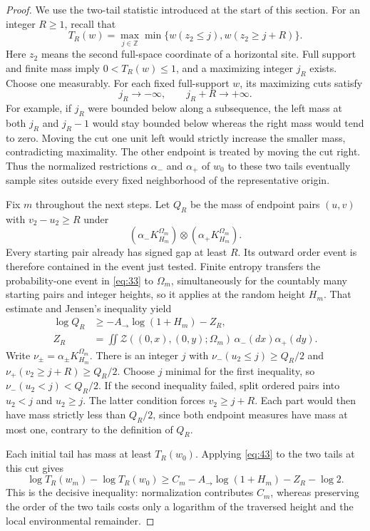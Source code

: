 \begin{proof}
We use the two-tail statistic introduced at the start of this section.
For an integer $R\ge1$, recall that
\[
 T_R(w)=\max_{j\in\mathbb Z}
 \min\{w(z_2\le j),w(z_2\ge j+R)\}.
\]
Here $z_2$ means the second full-space coordinate of a horizontal site.
Full support and finite mass imply $0<T_R(w)\le1$, and a maximizing
integer $j_R$ exists. Choose one measurably. For each fixed full-support
$w$, its maximizing cuts satisfy
\[
 j_R\longrightarrow-\infty,\qquad j_R+R\longrightarrow+\infty.
\]
For example, if $j_R$ were bounded below along a subsequence, the left
mass at both $j_R$ and $j_R-1$ would stay bounded below whereas the right
mass would tend to zero. Moving the cut one unit left would strictly
increase the smaller mass, contradicting maximality. The other endpoint
is treated by moving the cut right. Thus the normalized restrictions
$\alpha_-$ and $\alpha_+$ of $w_0$ to these two tails eventually sample
sites outside every fixed neighborhood of the representative origin.

Fix $m$ throughout the next steps. Let $Q_R$ be the mass of endpoint
pairs $(u,v)$ with $v_2-u_2\ge R$ under
\[
 (\alpha_-K_{H_m}^{\Omega_m})\otimes
 (\alpha_+K_{H_m}^{\Omega_m}).
\]
Every starting pair already has signed gap at least $R$. Its outward
order event is therefore contained in the event just tested. Finite
entropy transfers the probability-one event in \eqref{eq:33} to
$\Omega_m$, simultaneously for the countably many starting pairs and
integer heights, so it applies at the random height $H_m$. That estimate
and Jensen's inequality yield
\begin{equation*}\tag{46}\label{eq:46}
\begin{aligned}
 \log Q_R&\ge-A_\to\log(1+H_m)-Z_R,\\
 Z_R&=\iint\mathcal Z((0,x),(0,y);\Omega_m)
                \,\alpha_-(dx)\alpha_+(dy).
\end{aligned}
\end{equation*}
Write $\nu_\pm=\alpha_\pm K_{H_m}^{\Omega_m}$. There is an integer
$j$ with $\nu_-(u_2\le j)\ge Q_R/2$ and
$\nu_+(v_2\ge j+R)\ge Q_R/2$. Choose $j$ minimal for the first
inequality, so $\nu_-(u_2<j)<Q_R/2$. If the second inequality failed,
split ordered pairs into $u_2<j$ and $u_2\ge j$. The latter condition
forces $v_2\ge j+R$. Each part would then have mass strictly less than
$Q_R/2$, since both endpoint measures have mass at most one, contrary
to the definition of $Q_R$.

Each initial tail has mass at least $T_R(w_0)$. Applying
\eqref{eq:43} to the two tails at this cut gives
\begin{equation*}\tag{47}\label{eq:47}
 \log T_R(w_m)-\log T_R(w_0)
 \ge C_m-A_\to\log(1+H_m)-Z_R-\log2.
\end{equation*}
This is the decisive inequality: normalization contributes $C_m$,
whereas preserving the order of the two tails costs only a logarithm
of the traversed height and the local environmental remainder.


\end{proof}
